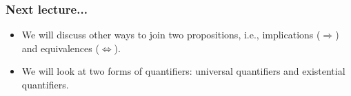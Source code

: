 \begin{frame}\frametitle{Next lecture...}
  \begin{itemize}
  \item
    We will discuss other ways to join two propositions, i.e.,
    implications ($\Rightarrow$) and equivalences ($\Leftrightarrow$).

  \item
    We will look at two forms of quantifiers: universal quantifiers
    and existential quantifiers.
  \end{itemize}
\end{frame}

